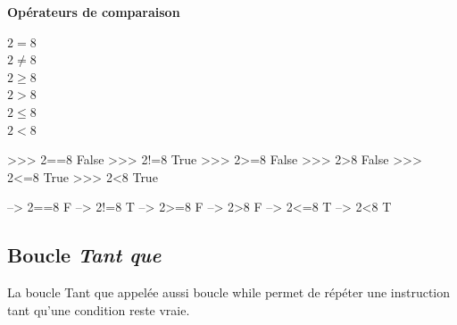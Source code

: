 \documentclass[10pt,fleqn]{article} %
\begin{document}
\begin{exemple}
\textbf{Opérateurs de comparaison}


\begin{minipage}[c]{.3\linewidth}

\begin{pseudo}
\begin{algorithm}[H]
$2=8 $ \\
$2\neq8 $\\
$2\geq 8 $\\
$2>8 $\\
$2\leq 8$\\
$2<8$\\
\end{algorithm}
\end{pseudo}

\end{minipage} \hfill
\begin{minipage}[c]{.3\linewidth}
\begin{py}
\begin{python}
 >>> 2==8
	False
 >>> 2!=8
	True
 >>> 2>=8
	False
 >>> 2>8
	False
 >>> 2<=8
	True
 >>> 2<8
	True
\end{python}
\end{py}
\end{minipage} \hfill
\begin{minipage}[c]{.3\linewidth}
\begin{sci}
\begin{scilab}
 --> 2==8
	F
 --> 2!=8
	T
 --> 2>=8
	F
 --> 2>8
	F
 --> 2<=8
	T
 --> 2<8
	T
\end{scilab}
\end{sci}
\end{minipage}

\end{exemple}



\subsection{Boucle \textsl{Tant que}}

\begin{defi}
La boucle \textsf{Tant que} appelée aussi boucle \textsf{while} permet de répéter une instruction tant qu'une condition reste vraie.
\end{defi}
\end{document}
